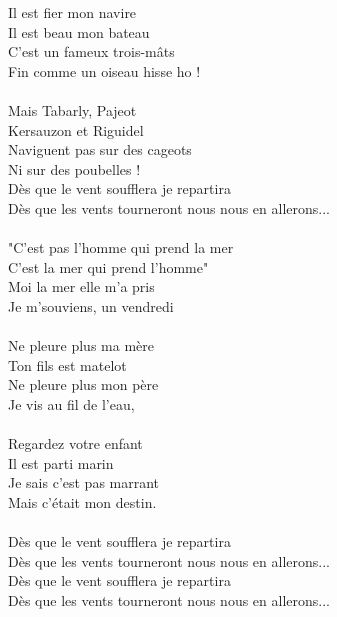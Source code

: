 Il est fier mon navire\\
Il est beau mon bateau\\
C'est un fameux trois-mâts\\
Fin comme un oiseau hisse ho !\\\\
Mais Tabarly, Pajeot\\
Kersauzon et Riguidel\\
Naviguent pas sur des cageots\\
Ni sur des poubelles !\\
Dès que le vent soufflera je repartira\\
Dès que les vents tourneront nous nous en allerons...\\\\
"C'est pas l'homme qui prend la mer\\
C'est la mer qui prend l'homme"\\
Moi la mer elle m'a pris\\
Je m'souviens, un vendredi\\\\
Ne pleure plus ma mère\\
Ton fils est matelot\\
Ne pleure plus mon père\\
Je vis au fil de l'eau,\\\\
Regardez votre enfant\\
Il est parti marin\\
Je sais c'est pas marrant\\
Mais c'était mon destin.\\\\
Dès que le vent soufflera je repartira\\
Dès que les vents tourneront nous nous en allerons...\\
Dès que le vent soufflera je repartira\\
Dès que les vents tourneront nous nous en allerons...\\
